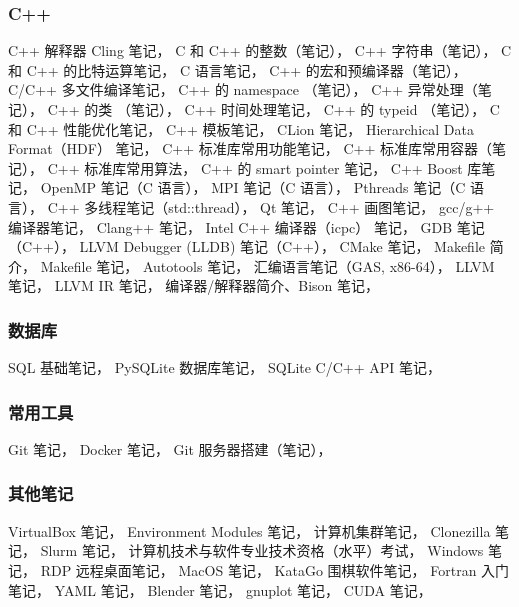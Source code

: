 \subsubsection{C++}
C++ 解释器 Cling 笔记，
C 和 C++ 的整数（笔记），
C++ 字符串（笔记），
C 和 C++ 的比特运算笔记，
C 语言笔记，
C++ 的宏和预编译器（笔记），
C/C++ 多文件编译笔记，
C++ 的 namespace （笔记），
C++ 异常处理（笔记），
C++ 的类 （笔记），
C++ 时间处理笔记，
C++ 的 typeid （笔记），
C 和 C++ 性能优化笔记，
C++ 模板笔记，
CLion 笔记，
Hierarchical Data Format（HDF） 笔记，
C++ 标准库常用功能笔记，
C++ 标准库常用容器（笔记），
C++ 标准库常用算法，
C++ 的 smart pointer 笔记，
C++ Boost 库笔记，
OpenMP 笔记（C 语言），
MPI 笔记（C 语言），
Pthreads 笔记（C 语言），
C++ 多线程笔记（std::thread），
Qt 笔记，
C++ 画图笔记，
gcc/g++ 编译器笔记，
Clang++ 笔记，
Intel C++ 编译器（icpc） 笔记，
GDB 笔记（C++），
LLVM Debugger (LLDB) 笔记（C++），
CMake 笔记，
Makefile 简介，
Makefile 笔记，
Autotools 笔记，
汇编语言笔记（GAS, x86-64），
LLVM 笔记，
LLVM IR 笔记，
编译器/解释器简介、Bison 笔记，

\subsubsection{数据库}
SQL 基础笔记，
PySQLite 数据库笔记，
SQLite C/C++ API 笔记，

\subsubsection{常用工具}
Git 笔记，
Docker 笔记，
Git 服务器搭建（笔记），

\subsubsection{其他笔记}
VirtualBox 笔记，
Environment Modules 笔记，
计算机集群笔记，
Clonezilla 笔记，
Slurm 笔记，
计算机技术与软件专业技术资格（水平）考试，
Windows 笔记，
RDP 远程桌面笔记，
MacOS 笔记，
KataGo 围棋软件笔记，
Fortran 入门笔记，
YAML 笔记，
Blender 笔记，
gnuplot 笔记，
CUDA 笔记，

